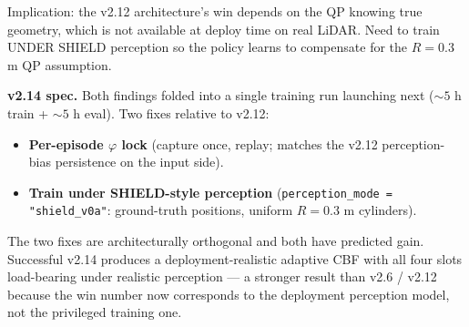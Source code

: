\documentclass[11pt]{article}
\begin{document}
Implication: the v2.12 architecture's win depends on the QP knowing
true geometry, which is not available at deploy time on real LiDAR.
Need to train UNDER SHIELD perception so the policy learns to
compensate for the $R = 0.3$ m QP assumption.

\noindent
\textbf{v2.14 spec.} Both findings folded into a single training run
launching next ($\sim 5$ h train + $\sim 5$ h eval). Two fixes
relative to v2.12:
\begin{itemize}
  \item \textbf{Per-episode $\varphi$ lock} (capture once, replay; matches the v2.12 perception-bias persistence on the input side).
  \item \textbf{Train under SHIELD-style perception} (\texttt{perception\_mode = "shield\_v0a"}: ground-truth positions, uniform $R = 0.3$ m cylinders).
\end{itemize}

The two fixes are architecturally orthogonal and both have predicted
gain. Successful v2.14 produces a deployment-realistic adaptive CBF
with all four slots load-bearing under realistic perception ---
a stronger result than v2.6 / v2.12 because the win number now
corresponds to the deployment perception model, not the privileged
training one.
\end{document}
